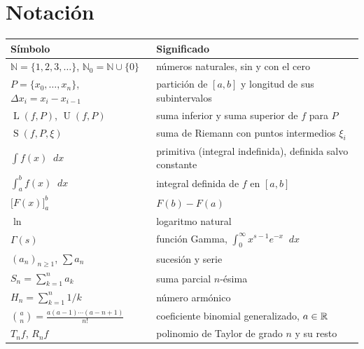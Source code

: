 \documentclass[11pt,a4paper,twoside,openany]{book}
\newcommand{\N}{\mathbb{N}}
\newcommand{\dif}{\mathop{}\!d}
\newcommand{\Lsum}{\operatorname{L}}
\newcommand{\Usum}{\operatorname{U}}
\newcommand{\Rsum}{\operatorname{S}}
\newcommand{\eval}[3]{\bigl[#1\bigr]_{#2}^{#3}}
\begin{document}
\section*{Notación}
\begin{center}
\begin{tabular}{@{}ll@{}}
\toprule
Símbolo & Significado \\
\midrule
$\N=\{1,2,3,\dots\}$, $\N_0=\N\cup\{0\}$ & números naturales, sin y con el cero \\
$P=\{x_0,\dots,x_n\}$, $\Delta x_i=x_i-x_{i-1}$ & partición de $[a,b]$ y longitud de sus subintervalos \\
$\Lsum(f,P)$, $\Usum(f,P)$ & suma inferior y suma superior de $f$ para $P$ \\
$\Rsum(f,P,\xi)$ & suma de Riemann con puntos intermedios $\xi_i$ \\
$\int f(x)\dif x$ & primitiva (integral indefinida), definida salvo constante \\
$\int_a^b f(x)\dif x$ & integral definida de $f$ en $[a,b]$ \\
$\eval{F(x)}{a}{b}$ & $F(b)-F(a)$ \\
$\ln$ & logaritmo natural \\
$\Gamma(s)$ & función Gamma, $\int_0^\infty x^{s-1}e^{-x}\dif x$ \\
$(a_n)_{n\ge1}$, $\sum a_n$ & sucesión y serie \\
$S_n=\sum_{k=1}^{n}a_k$ & suma parcial $n$-ésima \\
$H_n=\sum_{k=1}^{n}1/k$ & número armónico \\
$\binom{a}{n}=\frac{a(a-1)\cdots(a-n+1)}{n!}$ & coeficiente binomial generalizado, $a\in\mathbb{R}$ \\
$T_n f$, $R_n f$ & polinomio de Taylor de grado $n$ y su resto \\
\bottomrule
\end{tabular}
\end{center}


\tableofcontents

\mainmatter







\backmatter

\end{document}
